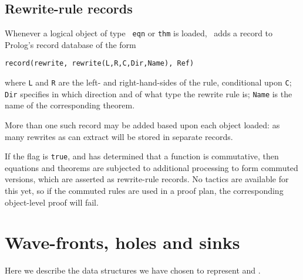 \subsection {Rewrite-rule records}
 Whenever a logical object of type {\tt
eqn} or {\tt thm} is loaded, \clam\ adds a record to Prolog's record
database of the form
\begin{verbatim}
record(rewrite, rewrite(L,R,C,Dir,Name), Ref)
\end{verbatim}
where {\tt L} and {\tt R} are the left- and right-hand-sides of the
rule, conditional upon {\tt C}; {\tt Dir} specifies in which direction
and of what type the rewrite rule is; {\tt Name} is the name of the
corresponding theorem.

More than one such record may be added based upon each object loaded:
as many rewrites as \clam{} can extract will be stored in separate
records.  

If the flag  is {\tt true}, and \clam has determined
that a function is commutative, then equations and theorems are
subjected to additional processing to form commuted versions, which are
asserted as rewrite-rule records. No tactics are available for this yet,
so if the commuted rules are used in a proof plan, the corresponding
object-level proof will fail.


\section {Wave-fronts, holes and sinks}
\label {sec:representation}
Here we describe the data structures we have chosen to represent
 and
.


